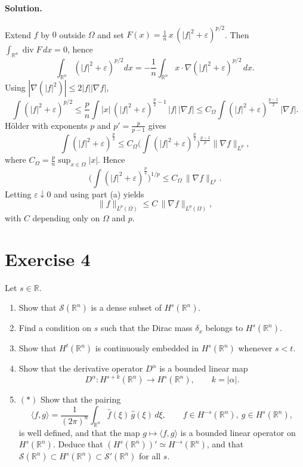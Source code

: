 \documentclass[12pt,a4paper]{article}
\theoremstyle{plain}
\theoremstyle{definition}
\theoremstyle{remark}
\theoremstyle{remark}
\begin{document}
\paragraph{Solution.}
Extend $f$ by $0$ outside $\Omega$ and set $F(x)=\tfrac{1}{n}\,x\,(|f|^2+\varepsilon)^{p/2}$.
Then $\int_{\mathbb R^n}\!\operatorname{div}F\,dx=0$, hence
\[
\int_{\mathbb R^n} (|f|^2+\varepsilon)^{p/2} dx
= -\frac{1}{n}\int_{\mathbb R^n} x\cdot \nabla (|f|^2+\varepsilon)^{p/2}\,dx.
\]
Using $|\nabla(|f|^2)|\le 2|f||\nabla f|$,
\[
\int (|f|^2+\varepsilon)^{p/2}
\le \frac{p}{n}\!\int |x|\, (|f|^2+\varepsilon)^{\frac{p}{2}-1}\,|f|\,|\nabla f|
\le C_\Omega \!\int (|f|^2+\varepsilon)^{\frac{p-1}{2}}\,|\nabla f|.
\]
H\"older with exponents $p$ and $p'=\frac{p}{p-1}$ gives
\[
\int (|f|^2+\varepsilon)^{\frac{p}{2}}
\le C_\Omega \Big(\int (|f|^2+\varepsilon)^{\frac{p}{2}}\Big)^{\!\frac{p-1}{p}}
\|\nabla f\|_{L^p},
\]
where $C_\Omega=\tfrac{p}{n}\sup_{x\in\Omega}|x|$.
Hence
\[
\Big(\int (|f|^2+\varepsilon)^{\frac{p}{2}}\Big)^{1/p} \le C_\Omega\,\|\nabla f\|_{L^p}.
\]
Letting $\varepsilon\downarrow0$ and using part (a) yields
\[
\|f\|_{L^p(\Omega)} \le C\,\|\nabla f\|_{L^p(\Omega)},
\]
with $C$ depending only on $\Omega$ and $p$.

\section*{Exercise 4}



Let $s\in\mathbb R$.

\begin{enumerate}[label=(\alph*)]
	\item Show that $\mathcal S(\mathbb R^n)$ is a dense subset of $H^s(\mathbb R^n)$.
	\item Find a condition on $s$ such that the Dirac mass $\delta_x$ belongs to $H^s(\mathbb R^n)$.
	\item Show that $H^t(\mathbb R^n)$ is continuously embedded in $H^s(\mathbb R^n)$ whenever $s<t$.
	\item Show that the derivative operator $D^\alpha$ is a bounded linear map
	\[
	D^\alpha : H^{s+k}(\mathbb R^n)\to H^s(\mathbb R^n),\qquad k=|\alpha|.
	\]
	\item $(*)$ Show that the pairing
	\[
	\langle f,g\rangle = \frac{1}{(2\pi)^n}\int_{\mathbb R^n} \widehat f(\xi)\,\widehat g(\xi)\,d\xi,
	\qquad f\in H^{-s}(\mathbb R^n),\ g\in H^s(\mathbb R^n),
	\]
	is well defined, and that the map $g\mapsto \langle f,g\rangle$ is a bounded linear operator on $H^s(\mathbb R^n)$.
	Deduce that $(H^s(\mathbb R^n))' \simeq H^{-s}(\mathbb R^n)$, and that
	$\mathcal S(\mathbb R^n)\subset H^s(\mathbb R^n)\subset \mathcal S'(\mathbb R^n)$ for all $s$.
\end{enumerate}
\end{document}

